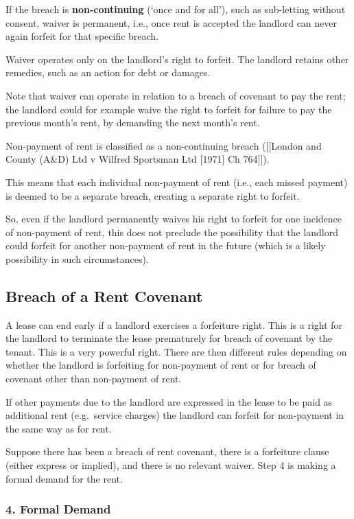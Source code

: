 \documentclass[
]{article}
\begin{document}
If the breach is \textbf{non-continuing} (`once and for all'), such as
sub-letting without consent, waiver is permanent, i.e., once rent is
accepted the landlord can never again forfeit for that specific breach.

Waiver operates only on the landlord's right to forfeit. The landlord
retains other remedies, such as an action for debt or damages.

Note that waiver can operate in relation to a breach of covenant to pay
the rent; the landlord could for example waive the right to forfeit for
failure to pay the previous month's rent, by demanding the next month's
rent.

Non-payment of rent is classified as a non-continuing breach
({[}{[}London and County (A\&D) Ltd v Wilfred Sportsman Ltd {[}1971{]}
Ch 764{]}{]}).

This means that each individual non-payment of rent (i.e., each missed
payment) is deemed to be a separate breach, creating a separate right to
forfeit.

So, even if the landlord permanently waives his right to forfeit for one
incidence of non-payment of rent, this does not preclude the possibility
that the landlord could forfeit for another non-payment of rent in the
future (which is a likely possibility in such circumstances).

\hypertarget{breach-of-a-rent-covenant}{%
\subsection{Breach of a Rent Covenant}\label{breach-of-a-rent-covenant}}

A lease can end early if a landlord exercises a forfeiture right. This
is a right for the landlord to terminate the lease prematurely for
breach of covenant by the tenant. This is a very powerful right. There
are then different rules depending on whether the landlord is forfeiting
for non-payment of rent or for breach of covenant other than non-payment
of rent.

If other payments due to the landlord are expressed in the lease to be
paid as additional rent (e.g.~service charges) the landlord can forfeit
for non-payment in the same way as for rent.

Suppose there has been a breach of rent covenant, there is a forfeiture
clause (either express or implied), and there is no relevant waiver.
Step 4 is making a formal demand for the rent.

\hypertarget{formal-demand}{%
\subsubsection{4. Formal Demand}\label{formal-demand}}
\end{document}
